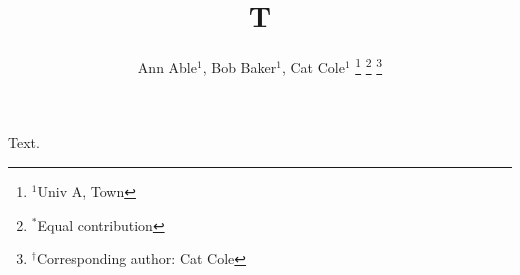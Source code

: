 \documentclass[journal]{IEEEtran}
\begin{document}
\title{T}
\author{Ann Able$^1$, Bob Baker$^1$, Cat Cole$^1$%
\thanks{$^1$Univ A, Town}%
\thanks{$^{*}$Equal contribution}%
\thanks{$^{\dagger}$Corresponding author: Cat Cole}}
\maketitle
Text.
\end{document}
